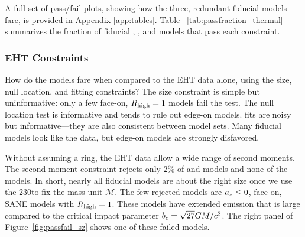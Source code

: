 A full set of pass/fail plots, showing how the three, redundant fiducial models fare, is provided in Appendix \ref{app:tables}.
Table ~\ref{tab:passfraction_thermal} summarizes the fraction of fiducial \kharma, \bhac, and \hamr models that pass each constraint.



\subsubsection{EHT Constraints}

How do the models fare when compared to the EHT data alone, using the size, null location, and \mring fitting constraints?  The size constraint is simple but uninformative: only a few face-on, $R_\mathrm{high} = 1$ models fail the test.
The null location test is informative and tends to rule out edge-on models.
\Mring fits are noisy but informative---they are also consistent between model sets.
Many fiducial models look like the data, but edge-on models are strongly disfavored.


Without assuming a ring, the EHT data allow a wide range of second moments.
The second moment constraint rejects only 2\% of \kharma and \bhac models and none of the \hamr models.
In short, nearly all fiducial models are about the right size once we use the 230\GHz to fix the mass unit $\mathcal{M}$.
The few rejected models are $a_* \le 0$, face-on, SANE models with $R_\mathrm{high} = 1$.
These models have extended emission that is large compared to the critical impact parameter $b_c = \sqrt{27} GM/c^2$.
The right panel of Figure~\ref{fig:passfail_sz} shows one of these failed models.

\label{sec:vam}

